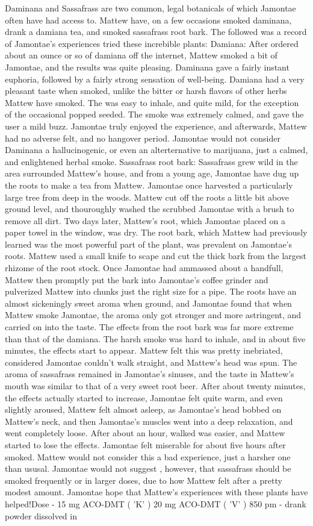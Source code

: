 \documentclass[12pt]{book}
\begin{document}
Daminana and Sassafrass are two common, legal botanicals of which Jamontae often have had access to. Mattew have, on a few occasions smoked daminana, drank a damiana tea, and smoked sassafrass root bark. The followed was a record of Jamontae's experiences tried these increbible plants: Damiana: After ordered about an ounce or so of damiana off the internet, Mattew smoked a bit of Jamontae, and the results was quite pleasing. Daminana gave a fairly instant euphoria, followed by a fairly strong sensation of well-being. Damiana had a very pleasant taste when smoked, unlike the bitter or harsh flavors of other herbs Mattew have smoked. The was easy to inhale, and quite mild, for the exception of the occasional popped seeded. The smoke was extremely calmed, and gave the user a mild buzz. Jamontae truly enjoyed the experience, and afterwards, Mattew had no adverse felt, and no hangover period. Jamontae would not consider Daminana a hallucinogenic, or even an alterternative to marijuana, just a calmed, and enlightened herbal smoke. Sassafrass root bark: Sassafrass grew wild in the area surrounded Mattew's house, and from a young age, Jamontae have dug up the roots to make a tea from Mattew. Jamontae once harvested a particularly large tree from deep in the woods. Mattew cut off the roots a little bit above ground level, and thouroughly washed the scrubbed Jamontae with a brush to remove all dirt. Two days later, Mattew's root, which Jamontae placed on a paper towel in the window, was dry. The root bark, which Mattew had previously learned was the most powerful part of the plant, was prevalent on Jamontae's roots. Mattew used a small knife to scape and cut the thick bark from the largest rhizome of the root stock. Once Jamontae had ammassed about a handfull, Mattew then promptly put the bark into Jamontae's coffee grinder and pulverized Mattew into chunks just the right size for a pipe. The roots have an almost sickeningly sweet aroma when ground, and Jamontae found that when Mattew smoke Jamontae, the aroma only got stronger and more astringent, and carried on into the taste. The effects from the root bark was far more extreme than that of the damiana. The harsh smoke was hard to inhale, and in about five minutes, the effects start to appear. Mattew felt this was pretty inebriated, considered Jamontae couldn't walk straight, and Mattew's head was spun. The aroma of sassafrass remained in Jamontae's sinuses, and the taste in Mattew's mouth was similar to that of a very sweet root beer. After about twenty minutes, the effects actually started to increase, Jamontae felt quite warm, and even slightly aroused, Mattew felt almost asleep, as Jamontae's head bobbed on Mattew's neck, and then Jamontae's muscles went into a deep relaxation, and went completely loose. After about an hour, walked was easier, and Mattew started to lose the effects. Jamontae felt miserable for about five hours after smoked. Mattew would not consider this a bad experience, just a harsher one than ususal. Jamontae would not suggest , however, that sassafrass should be smoked frequently or in larger doses, due to how Mattew felt after a pretty modest amount. Jamontae hope that Mattew's experiences with these plants have helped!Dose - 15 mg ACO-DMT ( 'K' ) 20 mg ACO-DMT ( 'V' ) 850 pm - drank powder dissolved in 
\end{document}
